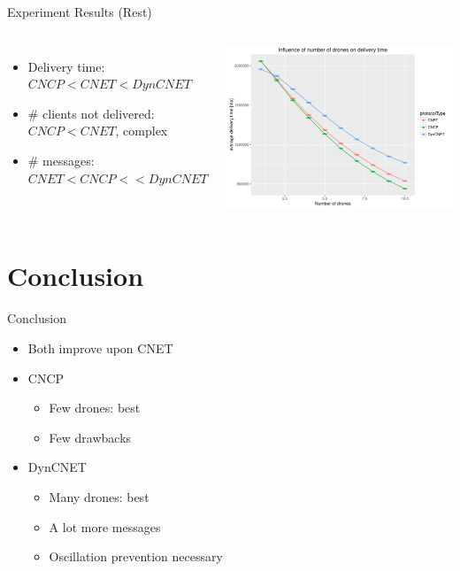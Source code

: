 \documentclass[notes]{beamer}
\begin{document}
	\begin{frame}{Experiment Results (Rest)}
		\begin{columns}[c]
			\begin{itemize}
				\item Delivery time: $CNCP < CNET < DynCNET$
				\item \# clients not delivered: $CNCP < CNET$, complex
				\item \# messages: $CNET < CNCP << DynCNET$
			\end{itemize}
			
			\includegraphics[width=\columnwidth]{drones-deliverytime}
		\end{columns}
	\end{frame}
	
	\section{Conclusion}
	\begin{frame}{Conclusion}
		\begin{itemize}
			\item Both improve upon CNET
			\item CNCP
				\begin{itemize}
				\item Few drones: best
				\item Few drawbacks
				\end{itemize}
			\item DynCNET
				\begin{itemize}
				\item Many drones: best
				\item A lot more messages
				\item Oscillation prevention necessary
				\end{itemize}
		\end{itemize}
	\end{frame}
	
\end{document}
